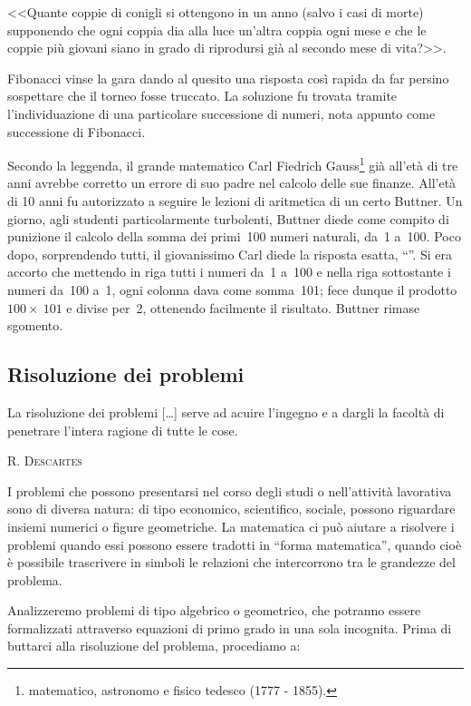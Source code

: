 <<Quante coppie di conigli si ottengono in un anno (salvo i
casi di morte) supponendo che ogni coppia dia alla luce
un'altra coppia ogni mese e che le coppie più
giovani siano in grado di riprodursi già al secondo mese di
vita?>>.

Fibonacci vinse la gara dando al quesito una risposta così rapida da
far persino sospettare che il torneo fosse truccato. La soluzione fu
trovata tramite l'individuazione di una particolare
successione di numeri, nota appunto come successione di Fibonacci.

Secondo la leggenda, il grande matematico Carl Fiedrich Gauss\footnote{matematico, astronomo e fisico tedesco (1777 - 1855).} già
all'età di tre anni avrebbe corretto un errore di
suo padre nel calcolo delle sue finanze. All'età di
10 anni fu autorizzato a seguire le lezioni di aritmetica di un certo
Buttner. Un giorno, agli studenti particolarmente turbolenti, Buttner
diede come compito di punizione il calcolo della somma dei primi~100
numeri naturali, da~1 a~100. Poco dopo, sorprendendo tutti, il giovanissimo Carl
diede la risposta esatta, ``''.
Si era accorto che mettendo in riga tutti i numeri da~1 a~100 e nella
riga sottostante i numeri da~100 a~1, ogni colonna dava come somma~101;
fece dunque il prodotto~$100\times~101$ e divise per~2, ottenendo facilmente il
risultato. Buttner rimase sgomento.

\subsection{Risoluzione dei problemi}

 \epigraph{La risoluzione dei problemi [\ldots] serve ad acuire
 l'ingegno e a dargli la facoltà di penetrare
 l'intera ragione di tutte le cose.}{{\scshape{R. Descartes}}}

I problemi che possono presentarsi nel corso degli studi o
nell'attività lavorativa sono di diversa natura: di
tipo economico, scientifico, sociale, possono riguardare insiemi
numerici o figure geometriche. La matematica ci può aiutare a
risolvere i problemi quando essi possono essere tradotti in
``forma matematica'', quando cioè
è possibile trascrivere in simboli le relazioni che intercorrono
tra le grandezze del problema.

Analizzeremo problemi di tipo algebrico o geometrico, che potranno
essere formalizzati attraverso equazioni di primo grado in una sola
incognita. Prima di buttarci alla risoluzione del problema, procediamo
a:

